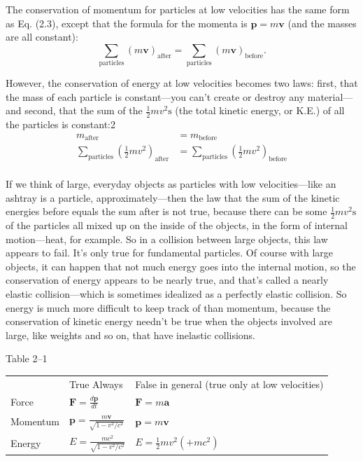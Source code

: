 \documentclass[11pt,oneside]{article}
\providecommand{\ddt}[2]{\frac{d#1}{d#2}}
\providecommand{\FLPF}{\mathbf{F}}
\providecommand{\FLPa}{\mathbf{a}}
\providecommand{\FLPp}{\mathbf{p}}
\providecommand{\FLPv}{\mathbf{v}}
\begin{document}
The conservation of momentum for particles at low velocities has the same form as Eq. (2.3), except that the formula for the momenta is \(\FLPp = m\FLPv\) (and the masses are all constant): 
\begin{equation*} \tag{2.8}
\label{Eq:TIPS:2:8} \sum_\text{particles} (m\FLPv)_\text{after} = \sum_\text{particles} (m\FLPv)_\text{before}. \end{equation*}
\par

However, the conservation of energy at low velocities becomes two laws: first, that the mass of each particle is constant---you can't create or destroy any material---and second, that the sum of the \(\frac12mv^2\text{s}\) (the total kinetic energy, or K.E.) of all the particles is constant:2 
\begin{equation*} \begin{aligned} m_\text{after} &= m_\text{before}\\[1ex] \sum_\text{particles} ({\textstyle\frac12}mv^2)_\text{after} &= \sum_\text{particles} ({\textstyle\frac12}mv^2)_\text{before}\\ \end{aligned} \tag{2.9}
\label{Eq:TIPS:2:9} \end{equation*}
\par

If we think of large, everyday objects as particles with low velocities---like an ashtray is a particle, approximately---then the law that the sum of the kinetic energies before equals the sum after is not true, because there can be some \(\frac12mv^2\text{s}\) of the particles all mixed up on the inside of the objects, in the form of internal motion---heat, for example. So in a collision between large objects, this law appears to fail. It's only true for fundamental particles. Of course with large objects, it can happen that not much energy goes into the internal motion, so the conservation of energy appears to be nearly true, and that's called a nearly elastic collision---which is sometimes idealized as a perfectly elastic collision. So energy is much more difficult to keep track of than momentum, because the conservation of kinetic energy needn't be true when the objects involved are large, like weights and so on, that have inelastic collisions.\par

\begin{center}
{\small Table 2--1}\par\smallskip
\begin{tabular}{lll}
 & True Always & False in general (true only at low velocities)\\
Force & \(\FLPF = \ddt{\FLPp}{t}\) & \(\FLPF = m\FLPa\)\\
Momentum & \(\FLPp = \frac{m\FLPv}{\sqrt{1-v^2/c^2}}\) & \(\FLPp = m\FLPv\)\\
Energy & \(E = \frac{mc^2}{\sqrt{1-v^2/c^2}}\) & \(E = \frac12mv^2 (+mc^2)\)
\end{tabular}
\end{center}
\end{document}
